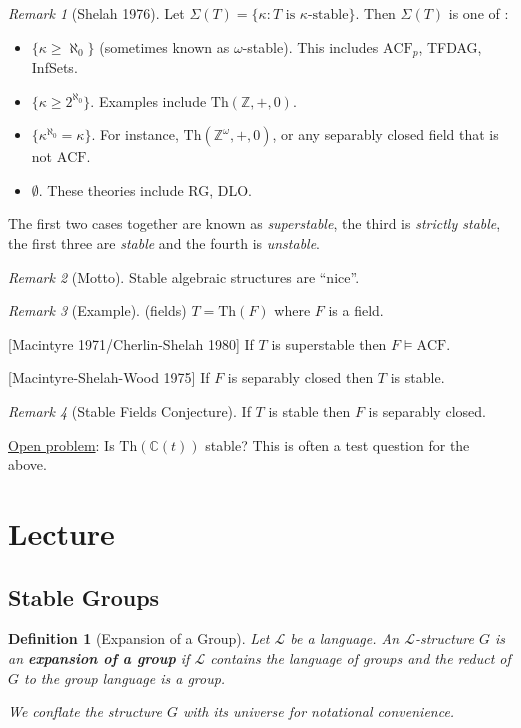 \documentclass[]{article}
\theoremstyle{custhm}
\theoremstyle{cusdef}
\newtheorem{defin}[theorem]{Definition}
\theoremstyle{custhm}
\theoremstyle{custhm}
\theoremstyle{custhm}
\theoremstyle{ex}
\theoremstyle{custhm}
\theoremstyle{cusdef}
\theoremstyle{remark}
\newtheorem*{remark*}{Remark}
\theoremstyle{remark}
\theoremstyle{numremark}
\newcommand{\Z}{\mathbb{Z}}
\newcommand{\C}{\mathbb{C}}
\newcommand{\undf}[1]{\textit{\textbf{#1}}}
\renewcommand{\L}{\mathcal{L}}
\renewcommand{\it}[1]{\textit{#1}}
\newcommand{\Th}{\textrm{Th}}
\newcommand{\acf}{\textrm{ACF}}
\begin{document}
\begin{remark*}[Shelah 1976]
	Let $\Sigma(T) = \{\kappa: T \textrm{ is }\kappa\textrm{-stable}\}$. Then $\Sigma(T)$ is one of :
	\begin{itemize}
		\item $\{\kappa \ge \aleph_0\}$ (sometimes known as $\omega$-stable). This includes $\acf_p$, TFDAG, InfSets.
		\item $\{\kappa \ge 2^{\aleph_0}\}$. Examples include $\Th(\Z,+,0)$.
		\item $\{\kappa^{\aleph_0} = \kappa\}$. For instance, $\Th(\Z^\omega,+,0)$, or any separably closed field that is not $\acf$.
		\item $\emptyset$. These theories include RG, DLO.
	\end{itemize}

	The first two cases together are known as \it{superstable}, the third is \it{strictly stable}, the first three are \it{stable} and the fourth is \it{unstable}.


\end{remark*}

\begin{remark*}[Motto]
	Stable algebraic structures are ``nice''.
\end{remark*}
\begin{remark*}[Example]
	(fields) $T = \Th(F)$ where $F$ is a field.

	[Macintyre 1971/Cherlin-Shelah 1980] If $T$ is superstable then $F\models \acf$.

	[Macintyre-Shelah-Wood 1975] If $F$ is separably closed then $T$ is stable.
\end{remark*}
\begin{remark*}[Stable Fields Conjecture]
	If $T$ is stable then $F$ is separably closed.	
\end{remark*}

\underline{Open problem}: Is $\Th(\C(t))$ stable? This is often a test question for the above.

\section{Lecture}

\subsection*{Stable Groups}

\begin{defin}[Expansion of a Group]
	Let $\L$ be a language. An $\L$-structure $G$ is an \undf{expansion of a group} if $\L$ contains the language of groups and the reduct of $G$ to the group language is a group.

	We conflate the structure $G$ with its universe for notational convenience.
\end{defin}
\end{document}
